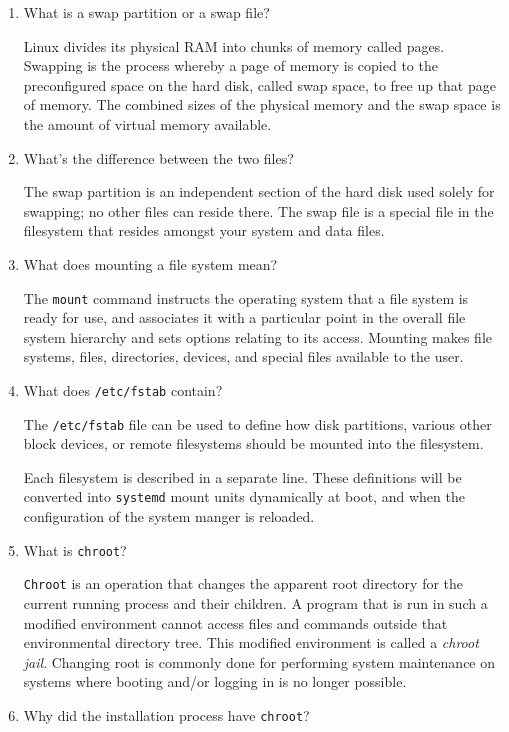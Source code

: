 \documentclass[]{article}
\newcommand{\code}{\texttt}
\begin{document}
\begin{enumerate}
\item What is a swap partition or a swap file?

Linux divides its physical RAM into chunks of memory called pages. Swapping is
the process whereby a page of memory is copied to the preconfigured space on the
hard disk, called swap space, to free up that page of memory. The combined sizes
of the physical memory and the swap space is the amount of virtual memory
available.

\item What's the difference between the two files?

The swap partition is an independent section of the hard disk used solely for
swapping; no other files can reside there. The swap file is a special file in the
filesystem that resides amongst your system and data files.

\item What does mounting a file system mean?

The \code{mount} command instructs the operating system that a file system is
ready for use, and associates it with a particular point in the overall file
system hierarchy and sets options relating to its access. Mounting makes file
systems, files, directories, devices, and special files available to the user.

\item What does \code{/etc/fstab} contain?

The \code{/etc/fstab} file can be used to define how disk partitions, various
other block devices, or remote filesystems should be mounted into the
filesystem.

Each filesystem is described in a separate line. These definitions will be
converted into \code{systemd} mount units dynamically at boot, and when the
configuration of the system manger is reloaded.

\item What is \code{chroot}?

\code{Chroot} is an operation that changes the apparent root directory for the
current running process and their children. A program that is run in such a
modified environment cannot access files and commands outside that environmental
directory tree. This modified environment is called a \emph{chroot jail}.
Changing root is commonly done for performing system maintenance on systems
where booting and/or logging in is no longer possible.

\item Why did the installation process have \code{chroot}?


\end{enumerate}
\end{document}
